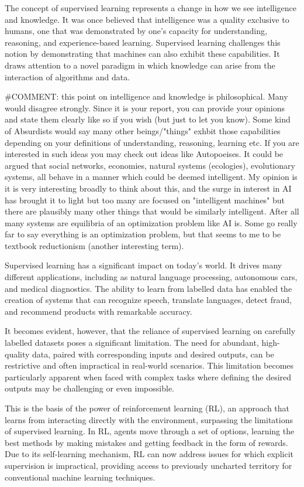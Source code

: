 \documentclass{article}
\begin{document}
The concept of supervised learning represents a change in how we see intelligence and knowledge. It was once believed that intelligence was a quality exclusive to humans, one that was demonstrated by one's capacity for understanding, reasoning, and experience-based learning. Supervised learning challenges this notion by demonstrating that machines can also exhibit these capabilities. It draws attention to a novel paradigm in which knowledge can arise from the interaction of algorithms and data. 

#COMMENT: this point on intelligence and knowledge is philosophical. Many would disagree strongly. Since it is your report, you can provide your opinions and state them clearly like so if you wish (but just to let you know). Some kind of Absurdists would say many other beings/"things" exhbit those capabilities depending on your definitions of understanding, reasoning, learning etc. If you are interested in such ideas you may check out ideas like Autopoeises. It could be argued that social networks, economies, natural systems (ecologies), evolutionary systems, all behave in a manner which could be deemed intelligent. My opinion is it is very interesting broadly to think about this, and the surge in interest in AI has brought it to light but too many are focused on "intelligent machines" but there are plausibly many other things that would be similarly intelligent. After all many systems are equilibria of an optimization problem like AI is. Some go really far to say everything is an optimization problem, but that seems to me to be textbook reductionism (another interesting term). 

Supervised learning has a significant impact on today's world. It drives many different applications, including as natural language processing, autonomous cars, and medical diagnostics. The ability to learn from labelled data has enabled the creation of systems that can recognize speech, translate languages, detect fraud, and recommend products with remarkable accuracy.

It becomes evident, however, that the reliance of supervised learning on carefully labelled datasets poses a significant limitation. The need for abundant, high-quality data, paired with corresponding inputs and desired outputs, can be restrictive and often impractical in real-world scenarios. This limitation becomes particularly apparent when faced with complex tasks where defining the desired outputs may be challenging or even impossible. 

This is the basis of the power of reinforcement learning (RL), an approach that learns from interacting directly with the environment, surpassing the limitations of supervised learning. In RL, agents move through a set of options, learning the best methods by making mistakes and getting feedback in the form of rewards. Due to its self-learning mechanism, RL can now address issues for which explicit supervision is impractical, providing access to previously uncharted territory for conventional machine learning techniques.
\end{document}
